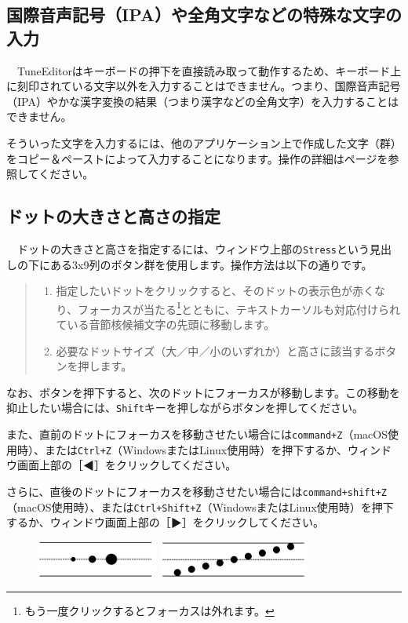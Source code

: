 \subsection{国際音声記号（IPA）や全角文字などの特殊な文字の入力}

　TuneEditorはキーボードの押下を直接読み取って動作するため、キーボード上に刻印されている文字以外を入力することはできません。つまり、国際音声記号（IPA）やかな漢字変換の結果（つまり漢字などの全角文字）を入力することはできません。

そういった文字を入力するには、他のアプリケーション上で作成した文字（群）をコピー＆ペーストによって入力することになります。操作の詳細は\pageref{copyPaste}ページを参照してください。


\subsection{ドットの大きさと高さの指定}

　ドットの大きさと高さを指定するには、ウィンドウ上部の\texttt{Stress}という見出しの下にある3x9列のボタン群を使用します。操作方法は以下の通りです。

\begin{quote}
\begin{enumerate}
\item 指定したいドットをクリックすると、そのドットの表示色が赤くなり、フォーカスが当たる\footnote{もう一度クリックするとフォーカスは外れます。}とともに、テキストカーソルも対応付けられている音節核候補文字の先頭に移動します。
\item 必要なドットサイズ（大／中／小のいずれか）と高さに該当するボタンを押します。
\end{enumerate}
\end{quote}

なお、ボタンを押下すると、次のドットにフォーカスが移動します。この移動を抑止したい場合には、\texttt{Shift}キーを押しながらボタンを押してください。

また、直前のドットにフォーカスを移動させたい場合には\texttt{command+Z}（macOS使用時）、または\texttt{Ctrl+Z}（WindowsまたはLinux使用時）を押下するか、ウィンドウ画面上部の［◀］をクリックしてください。

さらに、直後のドットにフォーカスを移動させたい場合には\texttt{command+shift+Z}（macOS使用時）、または\texttt{Ctrl+Shift+Z}（WindowsまたはLinux使用時）を押下するか、ウィンドウ画面上部の［▶］をクリックしてください。

\begin{figure}[htbp]
\begin{center}
	\includegraphics[width=4cm]{DotsSize.png}
	\includegraphics[width=5cm]{DotsHeight.png}
 \end{center}
 \label{sampleImage}
\end{figure}



